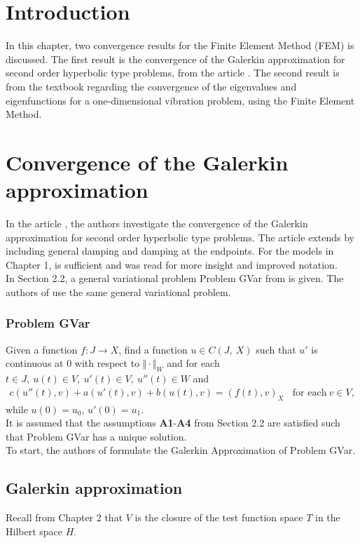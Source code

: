 \documentclass[../../main.tex]{subfiles}
\begin{document}
\section{Introduction}
In this chapter, two convergence results for the Finite Element Method (FEM) is discussed. The first result is the convergence of the Galerkin approximation for second order hyperbolic type problems, from the article \cite{BV13}. The second result is from the textbook \cite{SF97} regarding the convergence of the eigenvalues and eigenfunctions for a one-dimensional vibration problem, using the Finite Element Method.

\section{Convergence of the Galerkin approximation}
In the article \cite{BV13}, the authors investigate the convergence of the Galerkin approximation for second order hyperbolic type problems. The article \cite{BV18} extends \cite{BV13} by including general damping and damping at the endpoints. For the models in Chapter 1, \cite{BV13} is sufficient and \cite{BV18} was read for more insight and improved notation.\\

In Section 2.2, a general variational problem Problem GVar from \cite{VV02} is given. The authors of \cite{BV13} use the same general variational problem.

\subsubsection*{Problem GVar}
Given a function $f:J\rightarrow X$, find a function $u\in C(J,\ X)$ such that $u'$ is continuous at $0$ with respect to $\Vert \cdot \Vert_{W}$ and for each $t\in J,\ u(t)\in V,\ u'(t) \in V,\ u''(t)\in W$ and
\begin{eqnarray}
	c(u''(t),v)+a(u'(t),v)+b(u(t),v)= (f(t),v)_{X} \ \ \ \ \textrm{for each} \ v \in V, \label{GV_PB1}
\end{eqnarray}
while $u(0)=u_{0}$, $u'(0)=u_{1}$.\\

It is assumed that the assumptions \textbf{A1}-\textbf{A4} from Section 2.2 are satisfied such that Problem GVar has a unique solution.\\

To start, the authors of \cite{BV13} formulate the Galerkin Approximation of Problem GVar.

\subsection{Galerkin approximation}
 Recall from Chapter 2 that $V$ is the closure of the test function space $T$ in the Hilbert space $H$.\\
 
\end{document}
